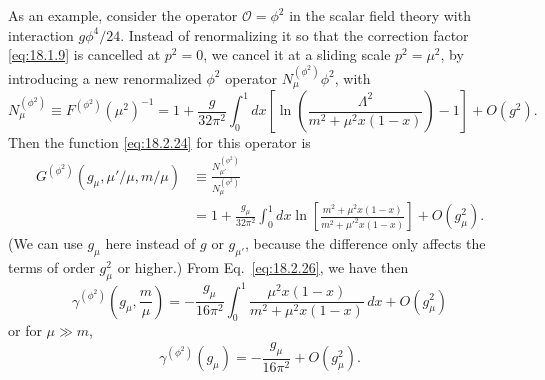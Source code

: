 As an example, consider the operator $\mathcal O=\phi^2$ in the scalar field
theory with interaction $g\phi^4/24$. Instead of renormalizing it so that the
correction factor \eqref{eq:18.1.9} is cancelled at $p^2=0$, we cancel it at a
sliding scale $p^2=\mu^2$, by introducing a new renormalized $\phi^2$ operator
$N_\mu^{(\phi^2)}\phi^2$, with
\[
N_\mu^{(\phi^2)}\equiv F^{(\phi^2)}(\mu^2)^{-1}
=1+\frac{g}{32\pi^2}\int_0^1dx
\left[\ln\left(\frac{\Lambda^2}{m^2+\mu^2x(1-x)}\right)-1\right]
+O(g^2).
\]
Then the function \eqref{eq:18.2.24} for this operator is
\[
\begin{aligned}
G^{(\phi^2)}(g_\mu,\mu'/\mu,m/\mu)
&\equiv\frac{N_{\mu'}^{(\phi^2)}}{N_\mu^{(\phi^2)}}\\
&=1+\frac{g_\mu}{32\pi^2}\int_0^1dx
\ln\left[\frac{m^2+\mu^2x(1-x)}{m^2+\mu'^2x(1-x)}\right]
+O(g_\mu^2).
\end{aligned}
\]
(We can use $g_\mu$ here instead of $g$ or $g_{\mu'}$, because the difference
only affects the terms of order $g_\mu^2$ or higher.) From
Eq.~\eqref{eq:18.2.26}, we have then
\[
\gamma^{(\phi^2)}\left(g_\mu,\frac{m}{\mu}\right)
=-\frac{g_\mu}{16\pi^2}\int_0^1
\frac{\mu^2x(1-x)}{m^2+\mu^2x(1-x)}\,dx+O(g_\mu^2)
\]
or for $\mu\gg m$,
\begin{equation}
\gamma^{(\phi^2)}(g_\mu)=-\frac{g_\mu}{16\pi^2}+O(g_\mu^2).
\tag{18.2.29}\label{eq:18.2.29}
\end{equation}
\par\noindent

